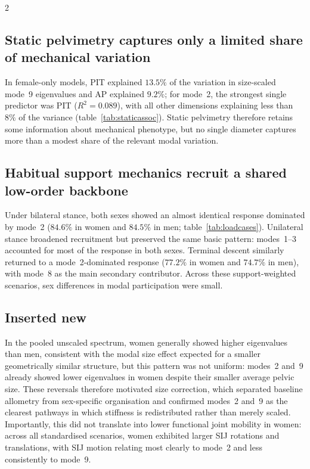\documentclass[openacc]{rsproca_new}
\begin{document}
\begin{multicols}{2}
\subsection{Static pelvimetry captures only a limited share of mechanical variation}

In female-only models, PIT explained $13.5\%$ of the variation in size-scaled mode~9 eigenvalues and AP explained $9.2\%$; for mode~2, the strongest single predictor was PIT ($R^2=0.089$), with all other dimensions explaining less than $8\%$ of the variance (table~\ref{tab:staticassoc}). Static pelvimetry therefore retains some information about mechanical phenotype, but no single diameter captures more than a modest share of the relevant modal variation.

\subsection{Habitual support mechanics recruit a shared low-order backbone}

Under bilateral stance, both sexes showed an almost identical response dominated by mode~2 ($84.6\%$ in women and $84.5\%$ in men; table~\ref{tab:loadcases}). Unilateral stance broadened recruitment but preserved the same basic pattern: modes~1--3 accounted for most of the response in both sexes. Terminal descent similarly returned to a mode~2-dominated response ($77.2\%$ in women and $74.7\%$ in men), with mode~8 as the main secondary contributor. Across these support-weighted scenarios, sex differences in modal participation were small.

\subsection{Inserted new} In the pooled unscaled spectrum, women generally showed higher eigenvalues than men, consistent with the modal size effect expected for a smaller geometrically similar structure, but this pattern was not uniform: modes~2 and~9 already showed lower eigenvalues in women despite their smaller average pelvic size. These reversals therefore motivated size correction, which separated baseline allometry from sex-specific organisation and confirmed modes~2 and~9 as the clearest pathways in which stiffness is redistributed rather than merely scaled. Importantly, this did not translate into lower functional joint mobility in women: across all standardised scenarios, women exhibited larger SIJ rotations and translations, with SIJ motion relating most clearly to mode~2 and less consistently to mode~9.



\end{multicols}
\end{document}
